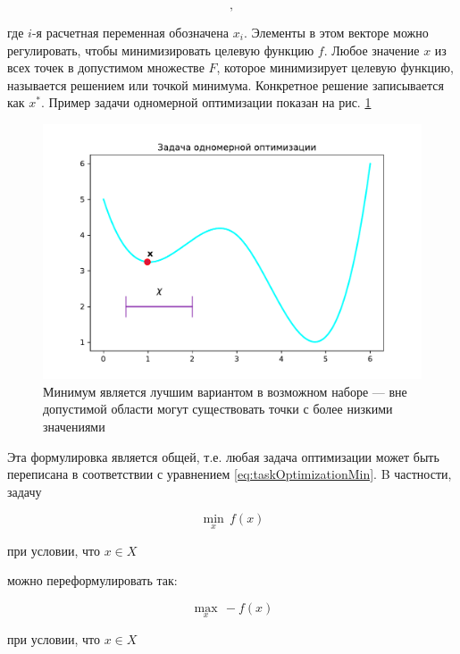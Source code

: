 \begin{equation}
    [x_1,x_2,...,x_n],
	\label{eq:arrayX}
\end{equation}

где $i$-я расчетная переменная обозначена $x_i$. Элементы в этом векторе можно регулировать, чтобы минимизировать целевую функцию $f$. \cite{kochenderfer2020optimization} Любое значение $x$ из всех точек в допустимом множестве $F$, которое минимизирует целевую функцию, называется решением или точкой минимума. Конкретное решение записывается как $x^*$. Пример задачи одномерной оптимизации показан на рис. \ref{fig:figure_1}

\begin{figure}[ht]
 \centering
		\includegraphics[height =7 cm, keepaspectratio]{../assets/images/Figure_1.pdf}
		\caption{Минимум является лучшим вариантом в возможном наборе —
вне допустимой области могут существовать точки с более низкими значениями
}
\label{fig:figure_1}
	\end{figure}

Эта формулировка является общей, т.е. любая задача оптимизации может быть переписана в соответствии с уравнением \eqref{eq:taskOptimizationMin}. B частности, задачу

\begin{equation}
  \min_{x} \, f(x) 
\end{equation}

\begin{center}
при условии, что $x \in X$
\end{center}

можно переформулировать так:

\begin{equation}
  \max_{x} \, -f(x) 
  \label{eq:TaskOptimizationMax}
\end{equation}

 \begin{center}
 при условии, что $x \in X$
 \end{center}
 
